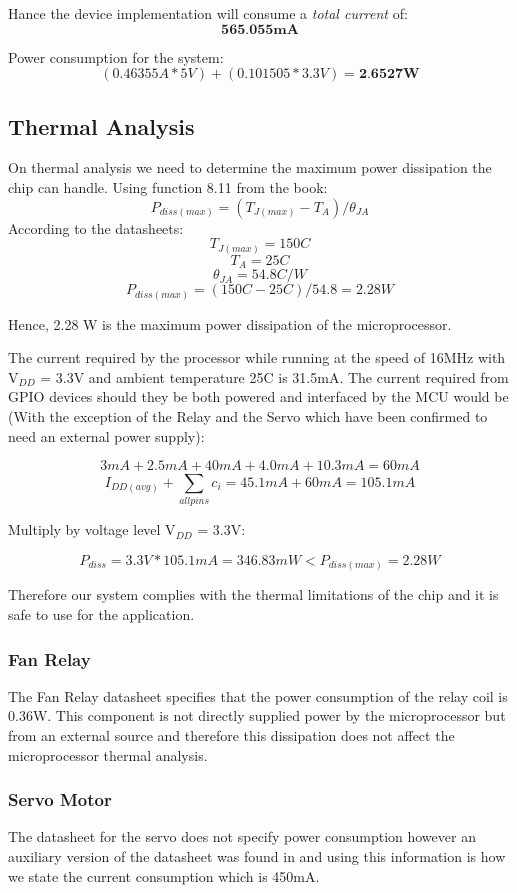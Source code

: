 		Hance the device implementation will consume a \emph{total current} of:
		$$ \textbf{565.055mA} $$
			
		Power consumption for the system:
		$$ (0.46355A * 5V) + (0.101505 * 3.3V) =  \textbf{2.6527W} $$

	\subsection{Thermal Analysis}
	
		On thermal analysis we need to determine the maximum power dissipation the chip can handle. Using function 8.11 from the book:
				$$P_{diss(max)}=(T_{J(max)}-T_{A})/\theta_{JA}$$
		According to the datasheets:
				$$T_{J(max)} = 150 C$$
				$$T_{A} = 25 C$$
				$$\theta_{JA}=54.8 C/W$$
				$$P_{diss(max)}=(150C-25C) / 54.8 = 2.28 W $$

		Hence, 2.28 W is the maximum power dissipation of the microprocessor.

		The current required by the processor while running at the speed of 16MHz with V$_{DD}$ = 3.3V and ambient temperature 25C is 31.5mA. The current required from GPIO devices should they be both powered and interfaced by the MCU would be (With the exception of the Relay and the Servo which have been confirmed to need an external power supply):

			$$  3mA + 2.5mA + 40mA + 4.0mA + 10.3mA = 60mA$$
			$$I_{DD(avg)} + \sum_{allpins}^{} c_i = 45.1mA + 60mA = 105.1mA$$

		Multiply by voltage level V$_{DD}$ = 3.3V:

			$$P_{diss}= 3.3V * 105.1mA = 346.83 mW < P_{diss(max)}= 2.28 W$$

		Therefore our system complies with the thermal limitations of the chip and it is safe to use for the application.


	\subsubsection{Fan Relay}

		The Fan Relay datasheet specifies that the power consumption of the relay coil is 0.36W. This component is not directly supplied power by the microprocessor but from an external source and therefore this dissipation does not affect the microprocessor thermal analysis.

	\subsubsection{Servo Motor}
		The datasheet for the servo does not specify power consumption however an auxiliary version of the datasheet was found in \cite{ref:servo1} and using this information is how we state the current consumption which is 450mA. 

